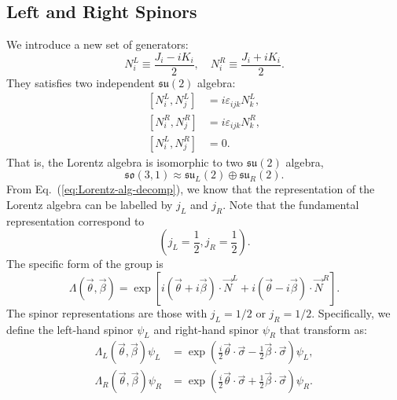 \subsection{Left and Right Spinors}
We introduce a new set of generators:
\begin{equation}
	N_i^{L} \equiv \frac{J_i - i K_i}{2}, \quad
	N_i^{R} \equiv \frac{J_i + i K_i}{2}.
\end{equation}
They satisfies two independent $\mathfrak{su}(2)$ algebra:
\begin{equation}
\begin{aligned}
	\left[N_i^L, N_j^L \right] &= i\varepsilon_{ijk}N_k^L, \\
	\left[N_i^R, N_j^R \right] &= i\varepsilon_{ijk}N_k^R, \\
	\left[N_i^L, N_j^R \right] &= 0.
\end{aligned}
\end{equation}
That is, the Lorentz algebra is isomorphic to two $\mathfrak{su}(2)$ algebra,
\begin{equation}
	\mathfrak{so}(3,1) \approx \mathfrak{su}_L(2)\oplus\mathfrak{su}_R(2).
	\label{eq:Lorentz-alg-decomp}
\end{equation}
From Eq.~(\ref{eq:Lorentz-alg-decomp}), we know that the representation of the Lorentz algebra can be labelled by $j_L$ and $j_R$.
Note that the fundamental representation correspond to
\begin{equation*}
	\left(j_L=\frac{1}{2},j_R=\frac{1}{2}\right).
\end{equation*}
The specific form of the group is
\begin{equation}
	\Lambda(\vec\theta,\vec\beta)
	=\exp\left[i(\vec\theta+i\vec\beta)\cdot \vec N^L + i(\vec\theta-i\vec\beta)\cdot \vec N^R\right].
\end{equation}
The spinor representations are those with $j_L=1/2$ or $j_R=1/2$. 
Specifically, we define the left-hand spinor $\psi_L$ and right-hand spinor $\psi_R$ that transform as:
\begin{equation}\label{eq:qft-left-right-spinor-rep}
\begin{aligned}
	\Lambda_L(\vec\theta,\vec\beta)\psi_L 
	&= \exp\left(\frac{i}{2}\vec\theta\cdot\vec\sigma-\frac{1}{2}\vec\beta\cdot\vec\sigma \right) \psi_L, \\
	\Lambda_R(\vec\theta,\vec\beta)\psi_R 
	&= \exp\left(\frac{i}{2}\vec\theta\cdot\vec\sigma+\frac{1}{2}\vec\beta\cdot\vec\sigma \right) \psi_R.
\end{aligned}
\end{equation}
